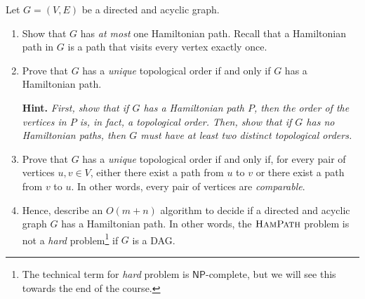 \documentclass{article}
\begin{document}
\begin{question}
Let $G = (V, E)$ be a directed and acyclic graph.

\begin{enumerate}[label = (\alph*)]
    \item Show that $G$ has {\em at most} one Hamiltonian path. Recall that a Hamiltonian path in $G$ is a path that visits every vertex exactly once.

    \item Prove that $G$ has a {\em unique} topological order if and only if $G$ has a Hamiltonian path.

    {\bfseries Hint.} {\em First, show that if $G$ has a Hamiltonian path $P$, then the order of the vertices in $P$ is, in fact, a topological order. Then, show that if $G$ has no Hamiltonian paths, then $G$ must have at least two distinct topological orders.}

    \item Prove that $G$ has a {\em unique} topological order if and only if, for every pair of vertices $u, v \in V$, either there exist a path from $u$ to $v$ or there exist a path from $v$ to $u$. In other words, every pair of vertices are {\em comparable}.

    \item Hence, describe an $O(m + n)$ algorithm to decide if a directed and acyclic graph $G$ has a Hamiltonian path. In other words, the $\mathsf{\textsc{HamPath}}$ problem is not a {\em hard} problem\footnote{The technical term for {\em hard} problem is $\mathsf{NP}$-complete, but we will see this towards the end of the course.} if $G$ is a DAG.
\end{enumerate}
\end{question}
\end{document}
